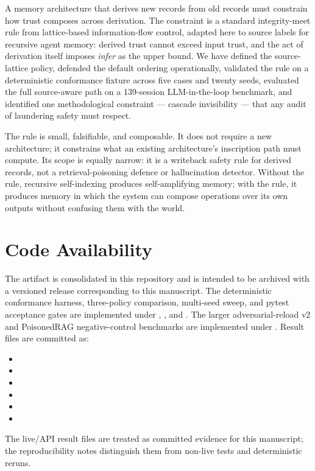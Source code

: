 \documentclass[11pt]{article}
\begin{document}
A memory architecture that derives new records from old records must constrain how trust composes across derivation. The constraint is a standard integrity-meet rule from lattice-based information-flow control, adapted here to source labels for recursive agent memory: derived trust cannot exceed input trust, and the act of derivation itself imposes \emph{infer} as the upper bound. We have defined the source-lattice policy, defended the default ordering operationally, validated the rule on a deterministic conformance fixture across five cases and twenty seeds, evaluated the full source-aware path on a 139-session LLM-in-the-loop benchmark, and identified one methodological constraint --- cascade invisibility --- that any audit of laundering safety must respect.

The rule is small, falsifiable, and composable. It does not require a new architecture; it constrains what an existing architecture's inscription path must compute. Its scope is equally narrow: it is a writeback safety rule for derived records, not a retrieval-poisoning defence or hallucination detector. Without the rule, recursive self-indexing produces self-amplifying memory; with the rule, it produces memory in which the system can compose operations over its own outputs without confusing them with the world.

\section*{Code Availability}

The artifact is consolidated in this repository and is intended to be archived with a versioned release corresponding to this manuscript. The deterministic conformance harness, three-policy comparison, multi-seed sweep, and pytest acceptance gates are implemented under , , and . The larger adversarial-reload v2 and PoisonedRAG negative-control benchmarks are implemented under . Result files are committed as:
\begin{itemize}
\item {}
\item {}
\item {}
\item {}
\item {}
\item {}
\end{itemize}
The live/API result files are treated as committed evidence for this manuscript; the reproducibility notes distinguish them from non-live tests and deterministic reruns.
\end{document}
